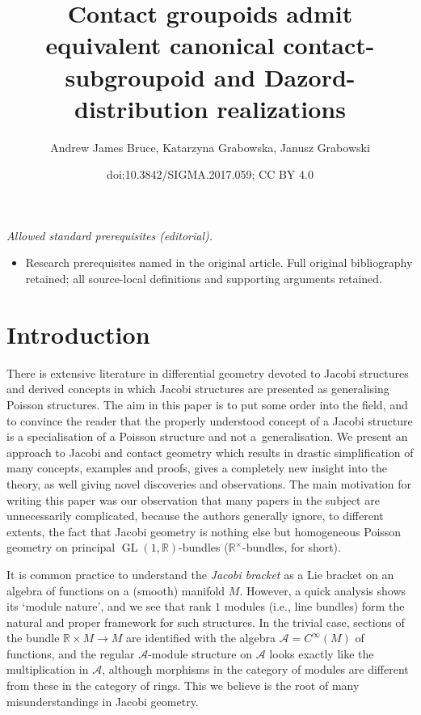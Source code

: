 \documentclass[10pt,a4paper]{amsart}
\title{Contact groupoids admit equivalent canonical contact-subgroupoid and Dazord-distribution realizations}
\author{Andrew James Bruce, Katarzyna Grabowska, Janusz Grabowski}
\date{doi:10.3842/SIGMA.2017.059; CC BY 4.0}
\DeclareMathOperator{\GL}{GL}
\newcommand{\R}{{\mathbb R}}
\newcommand{\ti}{\times}
\newcommand{\A}{{\cal A}}
\def\Rt{{\R^\times}}
\numberwithin{equation}{section}
\providecommand{\cal}{\mathcal}
\begin{document}
\maketitle
\noindent\textit{Allowed standard prerequisites (editorial).}\begin{itemize}
\item Research prerequisites named in the original article. Full original bibliography retained; all source-local definitions and supporting arguments retained.
\end{itemize}\medskip
\section{Introduction}\label{sec:Intro}
There is extensive literature in dif\/ferential geometry devoted to Jacobi structures and derived concepts in which Jacobi structures are presented as generalising Poisson structures. The aim in this paper is to put some order into the f\/ield, and to convince the reader that the properly understood concept of a Jacobi structure is a specialisation of a Poisson structure and not a~ge\-ne\-ralisation. We present an approach to Jacobi and contact geometry which results in drastic simplif\/ication of many concepts, examples and proofs, gives a completely new insight into the theory, as well giving novel discoveries and observations. The main motivation for writing this paper was our observation that many papers in the subject are unnecessarily complicated, because the authors generally ignore, to dif\/ferent extents, the fact that Jacobi geometry is nothing else but homogeneous Poisson geometry on principal $\GL(1,\R)$-bundles ($\Rt$-bundles, for short).

It is common practice to understand the \emph{Jacobi bracket} as a Lie bracket on an algebra of functions on a (smooth) manifold $M$. However, a quick analysis shows its `module nature', and we see that rank $1$ modules (i.e., line bundles) form the natural and proper framework for such structures. In the trivial case, sections of the bundle $\R\ti M\to M$ are identif\/ied with the algebra $\A=C^\infty(M)$ of functions, and the regular $\A$-module structure on $\A$ looks exactly like the multiplication in $\A$, although morphisms in the category of modules are dif\/ferent from these in the category of rings. This we believe is the root of many misunderstandings in Jacobi geometry.
\end{document}
